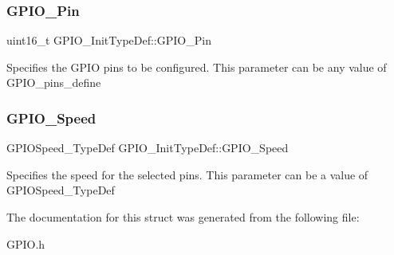 \subsubsection{\texorpdfstring{G\+P\+I\+O\+\_\+\+Pin}{GPIO\_Pin}}
{\footnotesize\ttfamily uint16\+\_\+t G\+P\+I\+O\+\_\+\+Init\+Type\+Def\+::\+G\+P\+I\+O\+\_\+\+Pin}

Specifies the G\+P\+IO pins to be configured. This parameter can be any value of G\+P\+I\+O\+\_\+pins\+\_\+define \mbox{\label{struct_g_p_i_o___init_type_def_ac05832cacebc861a9acf5294d702c16b}} 
\subsubsection{\texorpdfstring{G\+P\+I\+O\+\_\+\+Speed}{GPIO\_Speed}}
{\footnotesize\ttfamily G\+P\+I\+O\+Speed\+\_\+\+Type\+Def G\+P\+I\+O\+\_\+\+Init\+Type\+Def\+::\+G\+P\+I\+O\+\_\+\+Speed}

Specifies the speed for the selected pins. This parameter can be a value of G\+P\+I\+O\+Speed\+\_\+\+Type\+Def 

The documentation for this struct was generated from the following file\+:\begin{DoxyCompactItemize}
\item 
G\+P\+I\+O.\+h\end{DoxyCompactItemize}
